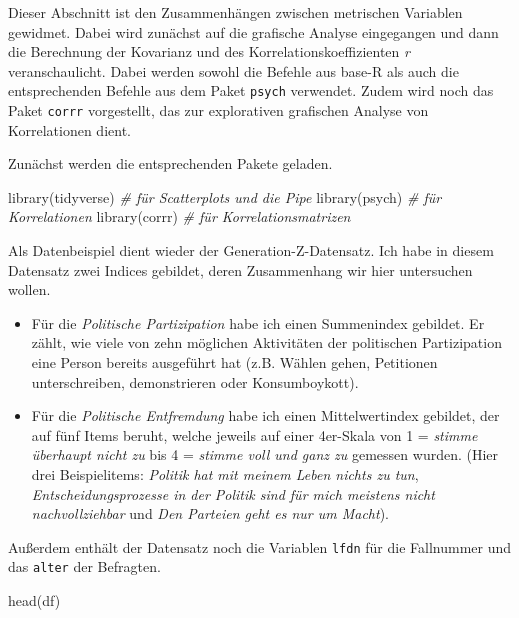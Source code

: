 \documentclass[
]{book}
\newenvironment{Shaded}{\begin{snugshade}}{\end{snugshade}}
\newcommand{\CommentTok}[1]{\textcolor[rgb]{0.56,0.35,0.01}{\textit{#1}}}
\newcommand{\FunctionTok}[1]{\textcolor[rgb]{0.00,0.00,0.00}{#1}}
\newcommand{\NormalTok}[1]{#1}
\begin{document}
Dieser Abschnitt ist den Zusammenhängen zwischen metrischen Variablen gewidmet. Dabei wird zunächst auf die grafische Analyse eingegangen und dann die Berechnung der Kovarianz und des Korrelationskoeffizienten \emph{r} veranschaulicht. Dabei werden sowohl die Befehle aus base-R als auch die entsprechenden Befehle aus dem Paket \texttt{psych} verwendet. Zudem wird noch das Paket \texttt{corrr} vorgestellt, das zur explorativen grafischen Analyse von Korrelationen dient.

Zunächst werden die entsprechenden Pakete geladen.

\begin{Shaded}
\begin{Highlighting}[]
\FunctionTok{library}\NormalTok{(tidyverse) }\CommentTok{\# für Scatterplots und die Pipe}
\FunctionTok{library}\NormalTok{(psych)     }\CommentTok{\# für Korrelationen}
\FunctionTok{library}\NormalTok{(corrr)     }\CommentTok{\# für Korrelationsmatrizen}
\end{Highlighting}
\end{Shaded}

Als Datenbeispiel dient wieder der Generation-Z-Datensatz. Ich habe in diesem Datensatz zwei Indices gebildet, deren Zusammenhang wir hier untersuchen wollen.

\begin{itemize}
\item
  Für die \emph{Politische Partizipation} habe ich einen Summenindex gebildet. Er zählt, wie viele von zehn möglichen Aktivitäten der politischen Partizipation eine Person bereits ausgeführt hat (z.B. Wählen gehen, Petitionen unterschreiben, demonstrieren oder Konsumboykott).
\item
  Für die \emph{Politische Entfremdung} habe ich einen Mittelwertindex gebildet, der auf fünf Items beruht, welche jeweils auf einer 4er-Skala von 1 = \emph{stimme überhaupt nicht zu} bis 4 = \emph{stimme voll und ganz zu} gemessen wurden. (Hier drei Beispielitems: \emph{Politik hat mit meinem Leben nichts zu tun}, \emph{Entscheidungsprozesse in der Politik sind für mich meistens nicht nachvollziehbar} und \emph{Den Parteien geht es nur um Macht}).
\end{itemize}

Außerdem enthält der Datensatz noch die Variablen \texttt{lfdn} für die Fallnummer und das \texttt{alter} der Befragten.

\begin{Shaded}
\begin{Highlighting}[]
\FunctionTok{head}\NormalTok{(df)}
\end{Highlighting}
\end{Shaded}
\end{document}
